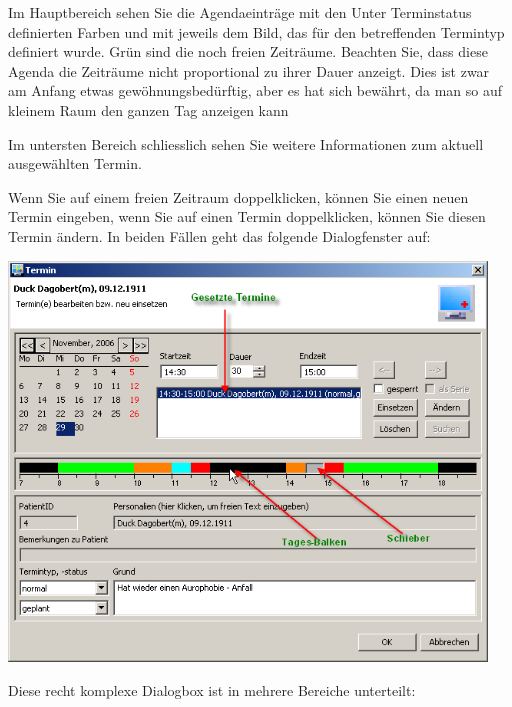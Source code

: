Im Hauptbereich sehen Sie die Agendaeinträge mit den Unter Terminstatus definierten Farben und mit jeweils dem Bild, das für den betreffenden Termintyp definiert wurde. Grün sind die noch freien  Zeiträume. Beachten Sie, dass diese Agenda die Zeiträume nicht proportional zu ihrer Dauer anzeigt. Dies ist zwar am Anfang etwas gewöhnungsbedürftig, aber es hat sich bewährt, da man so auf kleinem Raum den ganzen Tag anzeigen kann

Im untersten Bereich schliesslich sehen Sie weitere Informationen zum aktuell ausgewählten Termin.

Wenn Sie auf einem freien Zeitraum doppelklicken, können Sie einen neuen Termin eingeben, wenn Sie auf einen Termin doppelklicken,
können Sie diesen Termin ändern. In beiden Fällen geht das folgende Dialogfenster auf:



\includegraphics[width=5in]{images/use4.png}

Diese recht komplexe Dialogbox ist in mehrere Bereiche unterteilt:

